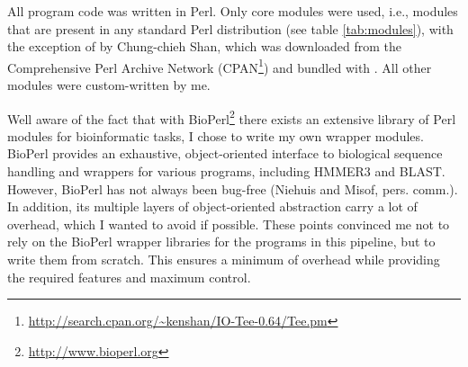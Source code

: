 All program code was written in Perl. Only core modules were used, i.e., modules
that are present in any standard Perl distribution (see table \ref{tab:modules}),
with the exception of  by Chung-chieh Shan, which was downloaded
from the Comprehensive Perl Archive Network
(CPAN\footnote{\url{http://search.cpan.org/~kenshan/IO-Tee-0.64/Tee.pm}}) and
bundled with \pname. All other modules were custom-written by me.



Well aware of the fact that with BioPerl\footnote{\url{http://www.bioperl.org}}
there exists an extensive library of Perl modules for bioinformatic tasks, I
chose to write my own wrapper modules. BioPerl provides an exhaustive,
object-oriented interface to biological sequence handling and wrappers for
various programs, including HMMER3 and BLAST. However, BioPerl has not always
been bug-free (Niehuis and Misof, pers. comm.). In addition, its multiple layers
of object-oriented abstraction carry a lot of overhead, which I wanted to avoid
if possible. These points convinced me not to rely on the BioPerl wrapper
libraries for the programs in this pipeline, but to write them from scratch.
This ensures a minimum of overhead while providing the required features and
maximum control.
